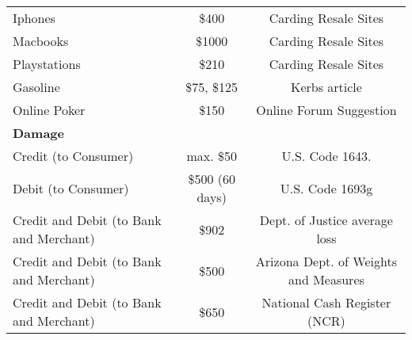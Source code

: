 \begin{tabular}{lcc}
    \quad Iphones & \$400 & Carding Resale Sites \cite{iphoneXSale} \\
    \quad Macbooks & \$1000 & Carding Resale Sites \cite{iphoneXSale} \\
    \quad Playstations & \$210 & Carding Resale Sites \cite{ps4Sale, viceInterviewWithCarder} \\
    \quad Gasoline & \$75, \$125 & Kerbs article \cite{krebsbladder, nacsHoldReport} \\
    \quad Online Poker & \$150 & Online Forum Suggestion \cite{poker150Suggest} \\
    \textbf{Damage} \\
    \quad Credit (to Consumer) & max. \$50 & U.S. Code 1643. \cite{cornellliability} \\
    \quad Debit (to Consumer) & \$500 (60 days) &  U.S. Code 1693g \cite{1693g} \\
    \quad Credit and Debit (to Bank and Merchant) & \$902 & Dept. of Justice average loss \cite{harrell2017} \\
    \quad Credit and Debit (to Bank and Merchant) & \$500 & Arizona Dept. of Weights and Measures \cite{arizonareport} \\
    \quad Credit and Debit (to Bank and Merchant) & \$650 & National Cash Register (NCR) \cite{rippleshot} \\

\end{tabular}
